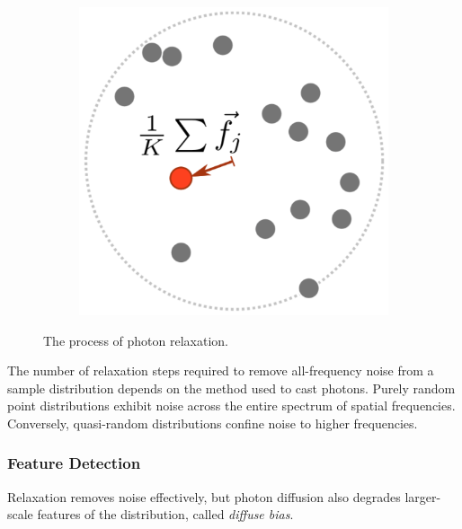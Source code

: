 \begin{figure}
\begin{center}
\begin{subfigure}[b]{0.32\textwidth}
		\caption{}
	\end{subfigure}
	\begin{subfigure}[b]{0.32\textwidth}
		\includegraphics[width=1.0\textwidth]{graphics/pm/pm-14-3}
		\caption{}
	\end{subfigure}
\end{center}
\caption{The process of photon relaxation.}
\end{figure}

The number of relaxation steps required to remove all-frequency noise from a sample distribution depends on the method used to cast photons. Purely random point distributions exhibit noise across the entire spectrum of spatial frequencies. Conversely, quasi-random distributions confine noise to higher frequencies.





\subsubsection{Feature Detection}\label{sec:Feature-Detection}
Relaxation removes noise effectively, but photon diffusion also degrades larger-scale features of the distribution, called \textit{diffuse bias}.

